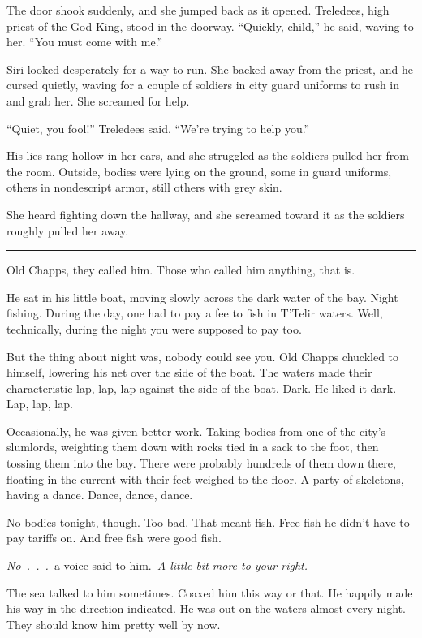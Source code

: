The door shook suddenly, and she jumped back as it opened. Treledees, high priest of the God King, stood in the doorway. “Quickly, child,” he said, waving to her. “You must come with me.”

Siri looked desperately for a way to run. She backed away from the priest, and he cursed quietly, waving for a couple of soldiers in city guard uniforms to rush in and grab her. She screamed for help.

“Quiet, you fool!” Treledees said. “We’re trying to help you.”

His lies rang hollow in her ears, and she struggled as the soldiers pulled her from the room. Outside, bodies were lying on the ground, some in guard uniforms, others in nondescript armor, still others with grey skin.

She heard fighting down the hallway, and she screamed toward it as the soldiers roughly pulled her away.

\bigskip \hrule \bigskip

Old Chapps, they called him. Those who called him anything, that is.

He sat in his little boat, moving slowly across the dark water of the bay. Night fishing. During the day, one had to pay a fee to fish in T’Telir waters. Well, technically, during the night you were supposed to pay too.

But the thing about night was, nobody could see you. Old Chapps chuckled to himself, lowering his net over the side of the boat. The waters made their characteristic lap, lap, lap against the side of the boat. Dark. He liked it dark. Lap, lap, lap.

Occasionally, he was given better work. Taking bodies from one of the city’s slumlords, weighting them down with rocks tied in a sack to the foot, then tossing them into the bay. There were probably hundreds of them down there, floating in the current with their feet weighed to the floor. A party of skeletons, having a dance. Dance, dance, dance.

No bodies tonight, though. Too bad. That meant fish. Free fish he didn’t have to pay tariffs on. And free fish were good fish.

\textit{No~.~.~.}~a voice said to him.~\textit{A little bit more to your right.}

The sea talked to him sometimes. Coaxed him this way or that. He happily made his way in the direction indicated. He was out on the waters almost every night. They should know him pretty well by now.

